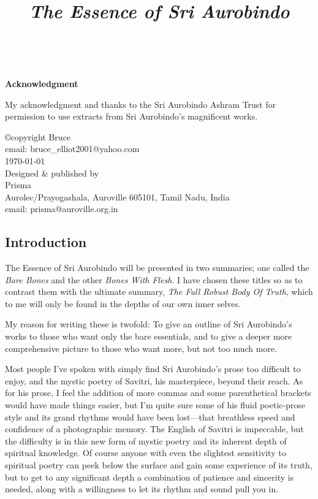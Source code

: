 \documentclass[12pt,a4paper]{book}
\title{\LARGE{\emph{The Essence of Sri Aurobindo}}}
\date{}
\begin{document}
\Large
\thispagestyle{empty}
\maketitle


\
\vspace{2cm}
\begin{center}{\bf Acknowledgment}\end{center}
\thispagestyle{empty}

My acknowledgment and thanks to the Sri Aurobindo Ashram Trust for
permission to use extracts from Sri Aurobindo's magnificent works.

\vspace{1.5cm}

\begin{center}
\copyright copyright Bruce\\
email: bruce\_elliot2001@yahoo.com\\
\today\\
\vspace{1cm}
Designed \& published by\\
Prisma\\
Aurolec/Prayogashala, Auroville 605101, Tamil Nadu, India\\
email: prisma@auroville.org.in\\
\end{center}
\newpage

\pagestyle{plain}
\begin{center}\section*{Introduction}\end{center}

The Essence of Sri Aurobindo will be presented in two summaries; one
called the \emph{Bare Bones} and the other \emph{Bones With Flesh}. I
have chosen these titles so as to contrast them with the ultimate
summary, \emph{The Full Robust Body Of Truth}, which to me will only
be found in the depths of our own inner selves.

My reason for writing these is twofold: To give an outline of Sri
Aurobindo's works to those who want only the bare essentials, and to
give a deeper more comprehensive picture to those who want more, but
not too much more.

Most people I've spoken with simply find Sri Aurobindo's prose too
difficult to enjoy, and the mystic poetry of Savitri, his masterpiece,
beyond their reach. As for his prose, I feel the addition of more
commas and some parenthetical brackets would have made things easier,
but I'm quite sure some of his fluid poetic-prose style and its grand
rhythms would have been lost---that breathless speed and confidence of
a photographic memory. The English of Savitri is impeccable, but the
difficulty is in this new form of mystic poetry and its inherent depth
of spiritual knowledge. Of course anyone with even the slightest
sensitivity to spiritual poetry can peek below the surface and gain
some experience of its truth, but to get to any significant depth a
combination of patience and sincerity is needed, along with a
willingness to let its rhythm and sound pull you in.
\end{document}
